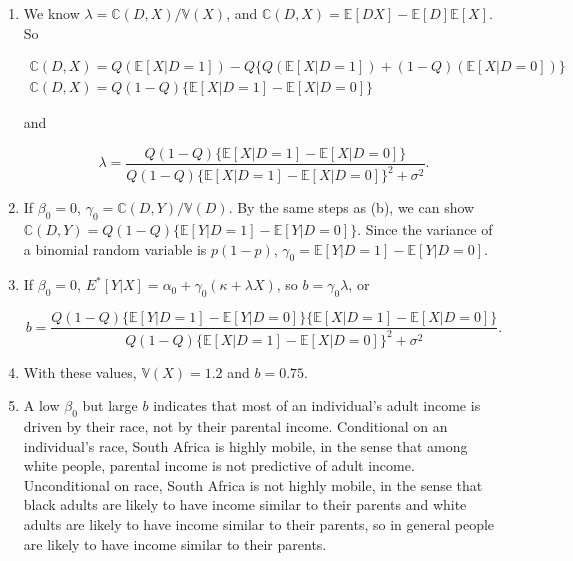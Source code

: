 \documentclass{article}
\begin{document}
\begin{enumerate}
\begin{enumerate}
		\item

		We know $\lambda = \mathbb{C}(D,X) / \mathbb{V}(X)$, and $\mathbb{C}(D,X) = \mathbb{E}[DX] - \mathbb{E}[D]\mathbb{E}[X]$. So

		\begin{gather*}
		\mathbb{C}(D,X) = Q(\mathbb{E}[X|D=1]) - Q \{ Q(\mathbb{E}[X|D=1]) + (1-Q)(\mathbb{E}[X|D=0]) \} \\
		\mathbb{C}(D,X) = Q(1-Q)\{ \mathbb{E}[X|D=1] - \mathbb{E}[X|D=0] \}
		\end{gather*}

		and

		\begin{equation*}
		\lambda = \frac{Q(1-Q)\{ \mathbb{E}[X|D=1] - \mathbb{E}[X|D=0] \}}{Q (1-Q) \{ \mathbb{E}[X|D=1] - \mathbb{E}[X|D=0] \} ^2 + \sigma^2}.
		\end{equation*}

		\item

		If $\beta_0 = 0$, $\gamma_0 = \mathbb{C}(D,Y)/\mathbb{V}(D)$. By the same steps as (b), we can show $\mathbb{C}(D,Y) = Q(1-Q)\{ \mathbb{E}[Y|D=1] - \mathbb{E}[Y|D=0] \}$. Since the variance of a binomial random variable is $p(1-p)$, $\gamma_0 = \mathbb{E}[Y|D=1] - \mathbb{E}[Y|D=0]$.

		\item 

		If $\beta_0 = 0$, $E^*[Y|X] = \alpha_0 + \gamma_0(\kappa + \lambda X)$, so $b = \gamma_0 \lambda$, or

		$$b = \frac{Q(1-Q) \{ \mathbb{E}[Y|D=1] - \mathbb{E}[Y|D=0] \} \{ \mathbb{E}[X|D=1] - \mathbb{E}[X|D=0] \}}{Q (1-Q) \{ \mathbb{E}[X|D=1] - \mathbb{E}[X|D=0] \} ^2 + \sigma^2}.$$

		\item

		With these values, $\mathbb{V}(X) = 1.2$ and $b = 0.75$.

		\item

		A low $\beta_0$ but large $b$ indicates that most of an individual's adult income is driven by their race, not by their parental income. Conditional on an individual's race, South Africa is highly mobile, in the sense that among white people, parental income is not predictive of adult income. Unconditional on race, South Africa is not highly mobile, in the sense that black adults are likely to have income similar to their parents and white adults are likely to have income similar to their parents, so in general people are likely to have income similar to their parents.


\end{enumerate}
\end{enumerate}
\end{document}
